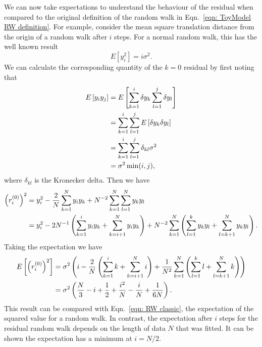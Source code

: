 \documentclass[../full_thesis/full_thesis.tex]{subfiles}
\begin{document}
\begin{subappendices}


We can now take expectations to understand the behaviour of the residual when
compared to the original definition of the random
walk in Eqn.~\ref{eqn: ToyModel RW definition}. For example, consider
the mean square translation distance from the origin of a random walk after $i$
steps. For a normal random walk, this has the well known result
\begin{equation}
E[y_{i}^{2}] = i \sigma^{2}.
\label{eqn: RW classic}
\end{equation}
We can calculate the corresponding quantity of the $k=0$ residual by first
noting that
\begin{align}
E\left[y_{i}y_{j}\right] & = E\left[\sum_{k=1}^{i}\delta y_{k} \sum_{l=1}^{j}\delta y_{l} \right] \\
& = \sum_{k=1}^{i}\sum_{l=1}^{j}E\left[\delta y_{k} \delta y_{l}\right] \\
& = \sum_{k=1}^{i}\sum_{l=1}^{j} \delta_{kl} \sigma^{2} \\
& = \sigma^{2}\min(i, j),
\label{eqn: E yiyi}
\end{align}
where $\delta_{kl}$ is the Kronecker delta. Then we have
\begin{align}
\left(r^{(0)}_{i}\right)^{2} & = y_{i}^{2} - \frac{2}{N}\sum_{k=1}^{N}y_{i}y_{k} + N^{-2}\sum_{k=1}^{N}\sum_{l=1}^{N}y_{k}y_{l} \\
& =  y_{i}^{2} - 2 N^{-1} \left(\sum_{k=1}^{i}y_{i}y_{k} + \sum_{k=i+1}^{N}y_{i}y_{k} \right)+ N^{-2}\sum_{k=1}^{N}\left(\sum_{l=1}^{k}y_{k}y_{l} + \sum_{l=k+1}^{N}y_{k}y_{l} \right).
\end{align}
Taking the expectation we have
\begin{align}
E\left[\left(r^{(0)}_{i}\right)^{2} \right] & = \sigma^{2}\left(i - \frac{2}{N}\left(\sum_{k=1}^{i}k + \sum_{k=i+1}^{N}i \right)+ \frac{1}{N^{2}}\sum_{k=1}^{N}\left(\sum_{l=1}^{k}l+ \sum_{l=k+1}^{N}k \right) \right) \\
& = \sigma^{2}\left(\frac{N}{3} - i + \frac{1}{2} + \frac{i^{2}}{N} - \frac{i}{N} + \frac{1}{6 N}\right).
\end{align}
This result can be compared with Eqn.~\eqref{eqn: RW classic}, the expectation
of the squared value for a random walk.  In contrast, the expectation after $i$
steps for the residual random walk depends on the length of data $N$ that was
fitted. It can be shown the expectation has a minimum at $i=N/2$.


\end{subappendices}
\end{document}
